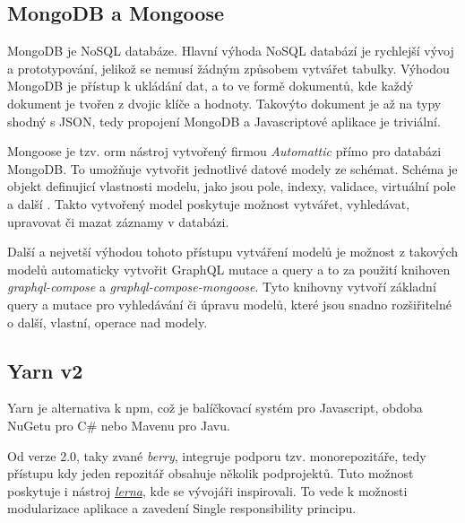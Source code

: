 \subsection{MongoDB a Mongoose}
\label{ss:mongoose}
MongoDB je NoSQL databáze. Hlavní výhoda NoSQL databází je rychlejší vývoj a prototypování, jelikož se nemusí žádným způsobem vytvářet tabulky. Výhodou MongoDB je přístup k ukládání dat, a to ve formě dokumentů, kde každý dokument je tvořen z dvojic klíče a hodnoty. Takovýto dokument je až na typy shodný s JSON, tedy propojení MongoDB a Javascriptové aplikace je triviální.

Mongoose je tzv. \acrfull{orm} nástroj vytvořený firmou \emph{Automattic} přímo pro databázi MongoDB. To umožňuje vytvořit jednotlivé datové modely ze schémat. Schéma je objekt definujicí vlastnosti modelu, jako jsou pole, indexy, validace, virtuální pole a další \cite{automatticinc_2020_mongoose}. Takto vytvořený model poskytuje možnost vytvářet, vyhledávat, upravovat či mazat záznamy v databázi.

Další a nejvetší výhodou tohoto přístupu vytváření modelů je možnost z takových modelů automaticky vytvořit GraphQL mutace a query a to za použití knihoven \emph{graphql-compose} a \emph{graphql-compose-mongoose}. Tyto knihovny vytvoří základní query a mutace pro vyhledávání či úpravu modelů, které jsou snadno rozšiřitelné o další, vlastní, operace nad modely.

\subsection{Yarn v2}
\label{ss:yarn}
Yarn je alternativa k \acrshort{npm}, což je balíčkovací systém pro Javascript, obdoba NuGetu pro C\# nebo Mavenu pro Javu.

Od verze 2.0, taky zvané \emph{berry}, integruje podporu tzv. monorepozitáře, tedy přístupu kdy jeden repozitář obsahuje několik podprojektů. Tuto možnost poskytuje i nástroj \href{https://github.com/lerna/lerna}{\emph{lerna}}, kde se vývojáři  inspirovali. To vede k možnosti modularizace aplikace a zavedení Single responsibility principu.

